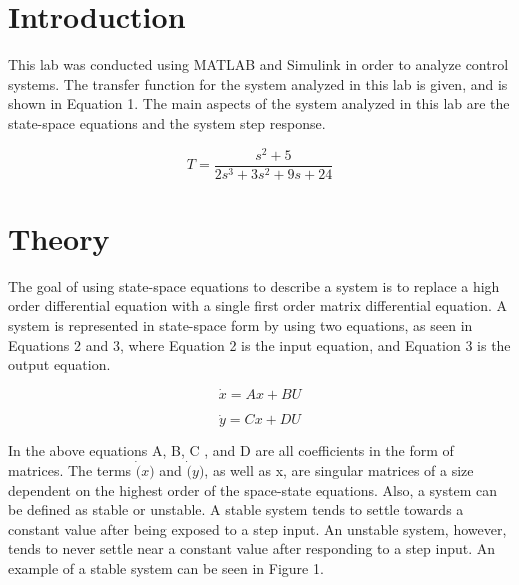 \documentclass[12pt]{article}
\begin{document}
\newpage



\section*{\fontsize{12}{12}\selectfont \large Introduction}
This lab was conducted using MATLAB and Simulink in order to analyze control systems. The transfer function for the system analyzed in this lab is given, and is shown in Equation 1. The main aspects of the system analyzed in this lab are the state-space equations and the system step response. 

\begin{equation}
T = \frac{s^2+5}{2s^3+3s^2+9s+24}
\end{equation}


\section*{\fontsize{12}{12}\selectfont \large Theory}
The goal of using state-space equations to describe a system is to replace a high order differential equation with a single first order matrix differential equation. A system is represented in state-space form by using two equations, as seen in Equations 2 and 3, where Equation 2 is the input equation, and Equation 3 is the output equation.
\bigskip

\begin{equation}
\dot{x} = Ax + BU
\end{equation}

\bigskip

\begin{equation}
\dot{y} = Cx + DU
\end{equation}

\bigskip

In the above equations A, B, C , and D are all coefficients in the form of matrices. The terms $\dot(x)$ and $\dot(y)$, as well as x, are singular matrices of a size dependent on the highest order of the space-state equations. Also, a system can be defined as stable or unstable. A stable system tends to settle towards a constant value after being exposed to a step input. An unstable system, however, tends to never settle near a constant value after responding to a step input. An example of a stable system can be seen in Figure 1.
\bigskip
\end{document}
